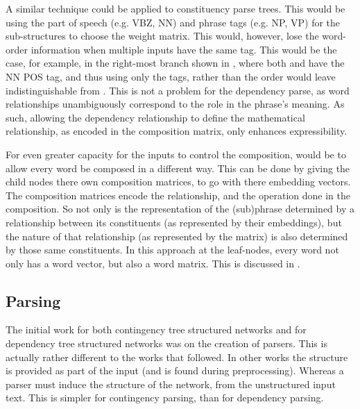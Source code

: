 {A similar technique could be applied to constituency parse trees.
This would be using the part of speech (e.g. VBZ, NN) and phrase tags (e.g. NP, VP) for the sub-structures to choose the weight matrix.
This would, however, lose the word-order information when multiple inputs have the same tag.
This would be the case, for example, in the right-most branch shown in , where both  and  have the NN POS tag, and thus using only the tags, rather than the order would leave  indistinguishable from .
This is not a problem for the dependency parse, as word relationships unambiguously correspond to the role in the phrase's meaning.
As such, allowing the dependency relationship to define the mathematical relationship, as encoded in the composition matrix, only enhances expressibility.



For even greater capacity for the inputs to control the composition,
would be to allow every word be composed in a different way.
This can be done by giving the child nodes there own composition matrices, to go with there embedding vectors.
The composition matrices encode the relationship, and the operation done in the composition.
So not only is the representation of the (sub)phrase determined by a relationship between  its constituents (as represented by their embeddings),
but the nature of that relationship (as represented by the matrix) is also determined by those same constituents.
In this approach at the leaf-nodes, every word not only has a word vector, but also a word matrix.
This is discussed in .



\subsection{Parsing} \label{sec:parsing}

The initial work for both contingency tree structured networks  \parencite{socher2010PhraseEmbedding} and for dependency tree structured networks  was on the creation of parsers.
This is actually rather different to the works that followed.
In other works the structure is provided as part of the input (and is found during preprocessing).
Whereas a parser must induce the structure of the network,
from the unstructured input text.
This is simpler for contingency parsing, than for dependency parsing.

}
